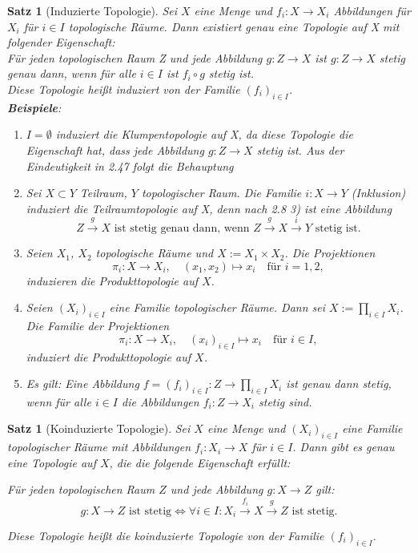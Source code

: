 \documentclass[a4paper,12pt]{article}
\theoremstyle{break}
\newtheorem{theorem}[definition]{Satz}
\begin{document}
\begin{theorem}[Induzierte Topologie]
    Sei $X$ eine Menge und $f_i:X \to X_i$ Abbildungen für $X_i$ für $i \in I$ topologische Räume.
    Dann existiert genau eine Topologie auf X mit folgender Eigenschaft: \\
    Für jeden topologischen Raum Z und jede Abbildung $g:Z \to X$ ist $g:Z \to X$ stetig genau dann, wenn für alle $i \in I$ ist $f_i \circ g$ stetig ist. \\ 
    Diese Topologie heißt induziert von der Familie $(f_i)_{i \in I}$. \\
    \textbf{Beispiele}: 
    \begin{enumerate}
        \item $I=\emptyset$ induziert die Klumpentopologie auf X, da diese Topologie die Eigenschaft hat, dass jede Abbildung $g:Z \to X$ stetig ist. Aus der Eindeutigkeit in 2.47 folgt die Behauptung
        \item Sei $X \subset Y$ Teilraum, $Y$ topologischer Raum. Die Familie $i:X \to Y$ (Inklusion) induziert die Teilraumtopologie auf X, denn nach 2.8 3) ist eine Abbildung
        \begin{equation*}
            Z \overset{g}{\rightarrow} X \text{ ist stetig genau dann, wenn } Z \overset{g}{\rightarrow} X \overset{i}{\rightarrow} Y \text{ stetig ist.}
        \end{equation*}
        \item Seien $X_1$, $X_2$ topologische Räume und $X := X_1 \times X_2$. Die Projektionen 
        \[
        \pi_i: X \to X_i, \quad (x_1, x_2) \mapsto x_i \quad \text{für } i=1,2,
        \]
        induzieren die Produkttopologie auf $X$.

        \item Seien $(X_i)_{i \in I}$ eine Familie topologischer Räume. Dann sei $X := \prod_{i \in I} X_i$. Die Familie der Projektionen 
        \[
        \pi_i: X \to X_i, \quad (x_i)_{i \in I} \mapsto x_i \quad \text{für } i \in I,
        \]
        induziert die Produkttopologie auf $X$.

        \item Es gilt: Eine Abbildung $f = (f_i)_{i \in I}: Z \to \prod_{i \in I} X_i$ ist genau dann stetig, wenn für alle $i \in I$ die Abbildungen $f_i: Z \to X_i$ stetig sind.
    \end{enumerate}
\end{theorem}

\begin{theorem}[Koinduzierte Topologie]
Sei $X$ eine Menge und $(X_i)_{i \in I}$ eine Familie topologischer Räume mit Abbildungen $f_i: X_i \to X$ für $i \in I$. Dann gibt es genau eine Topologie auf $X$, die die folgende Eigenschaft erfüllt:

Für jeden topologischen Raum $Z$ und jede Abbildung $g: X \to Z$ gilt:
\[
g: X \to Z \text{ ist stetig} \iff \forall i \in I: X_i \xrightarrow{f_i} X \xrightarrow{g} Z \text{ ist stetig.}
\]

Diese Topologie heißt die \emph{koinduzierte Topologie} von der Familie $(f_i)_{i \in I}$.
\end{theorem}
\end{document}
